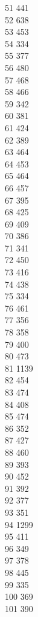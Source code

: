 { 51	441 \\
 52	638 \\
 53	453 \\
 54	334 \\
 55	377 \\
 56	480 \\
 57	468 \\
 58	466 \\
 59	342 \\
 60	381 \\
 61	424 \\
 62	389 \\
 63	464 \\
 64	453 \\
 65	464 \\
 66	457 \\
 67	395 \\
 68	425 \\
 69	409 \\
 70	386 \\
 71	341 \\
 72	450 \\
 73	416 \\
 74	438 \\
 75	334 \\
 76	461 \\
 77	356 \\
 78	358 \\
 79	400 \\
 80	473 \\
 81	1139 \\
 82	454 \\
 83	474 \\
 84	408 \\
 85	474 \\
 86	352 \\
 87	427 \\
 88	460 \\
 89	393 \\
 90	452 \\
 91	392 \\
 92	377 \\
 93	351 \\
 94	1299 \\
 95	411 \\
 96	349 \\
 97	378 \\
 98	445 \\
 99	335 \\
 100	369 \\
 101	390 \\
}
